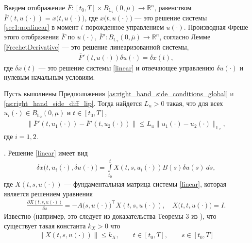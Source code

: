 \documentclass[../main.tex]{subfiles}
\begin{document}
	Введем отображение $\overline{F}: [t_0,T]  \times B_{\mathbb{L}_2}(0,\overline{\mu}) \to \mathbb{R}^n$, равенством $\overline{F}(t, u(\cdot)) = x \big(t, u(\cdot)\big) $, где $x \big(t, u(\cdot)\big)$ --- это решение системы \eqref{sec1:nonlinear} в момент $t$ порожденное управлением $u(\cdot)$.  Производная Фреше этого отображения $\overline{F}$ по $u(\cdot)$, $\overline{F}': B_{\mathbb{L}_2}(0,\overline{\mu}) \to \mathbb{R}^n $, согласно Лемме \ref{FrechetDerivative} --- это решение линеаризованной системы, 
	\begin{gather}\label{dF}
		\overline{F}'(t, u(\cdot)) \delta u(\cdot) = \delta x(t), 
	\end{gather}
	где $\delta x(t)$ --- это решение системы \eqref{linear} и отвечающее управлению $\delta u(\cdot)$ и нулевым начальным условиям.
	\begin{lemma}\label{lem:Lipdx_gloabal}
		Пусть выполнены Предположения \ref{as:right_hand_side_conditions_global} и \ref{as:right_hand_side_diff_lip}.  Тогда найдется  $L_u > 0$ такая, что для всех  $u_i(\cdot) \in B_{\mathbb{L}_2}(0,\mu)$ и $t \in [t_0,T]$, 
		\begin{gather*}
			\| \overline{F}'(t, u_1(\cdot)) - \overline{F}'(t, u_2(\cdot)) \| \leqslant L_u \| u_1(\cdot) - u_2(\cdot) \|_{\mathbb{L}_2},
		\end{gather*}
		где $i = 1,2$.
	\end{lemma}
	\doc. 
	Решение \eqref{linear} имеет вид
	\begin{gather}\label{xu}
		\delta x\big(t, u_i(\cdot),\delta u(\cdot)\big) = \int\limits_{t_0}^{t}  X(t,s,u_i(\cdot)) B(s) \delta u(s) \ ds,
	\end{gather}
	где $X(t,s,u(\cdot)) $ --- фундаментальная матрица системы \eqref{linear}, которая является решением уравнения
	\begin{gather*}
		\frac{\partial X(t, s, u(\cdot))}{\partial s} = -A\big(s,u(\cdot)\big)^{\top} X(t, s, u(\cdot)), \quad X\big(t, t, u(\cdot)\big) = I.
	\end{gather*}
	Известно (например, это следует из доказательства Теоремы 3 из \cite{Fillipov}), что существует такая константа $k_X>0$ что
	\begin{gather*}
		\| X(t,s, u(\cdot)) \| \leqslant k_X, \qquad t \in [t_0,T], \qquad s \in [t_0,T]
	\end{gather*}
\end{document}
